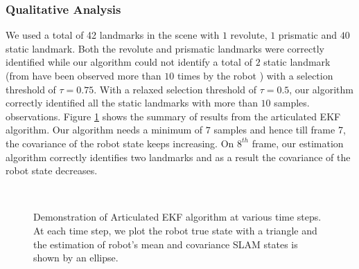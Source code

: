 \documentclass[conference]{IEEEtran}
\begin{document}
\subsubsection{Qualitative Analysis} We used a total of 42 landmarks in the scene with $1$ revolute, $1$ prismatic and $40$ static landmark. Both the revolute and prismatic landmarks were correctly identified while our algorithm could not identify a total of $2$ static landmark (from have been observed more than $10$ times by the robot ) with a selection threshold of $\tau = 0.75$. With a relaxed selection threshold of $\tau = 0.5$, our algorithm correctly identified all the static landmarks with more than $10$ samples. observations. Figure \ref{fig:articulated_ekf_model} shows the summary of results from the articulated EKF algorithm. Our algorithm needs a minimum of $7$ samples and hence till frame 7, the covariance of the robot state keeps increasing. On $8^{th}$ frame, our estimation algorithm correctly identifies two landmarks and as a result the covariance of the robot state decreases.
\begin{figure}
\\
\caption{Demonstration of Articulated EKF algorithm at various time steps. At each time step, we plot the robot true state with a triangle and the estimation of robot's mean and covariance SLAM states is shown by an ellipse.}
\label{fig:articulated_ekf_model}
\end{figure}
\end{document}

